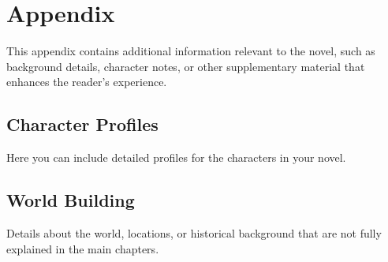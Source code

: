 \chapter*{Appendix}

This appendix contains additional information relevant to the novel, such as background details, character notes, or other supplementary material that enhances the reader's experience.

\section*{Character Profiles}
Here you can include detailed profiles for the characters in your novel.

\section*{World Building}
Details about the world, locations, or historical background that are not fully explained in the main chapters.